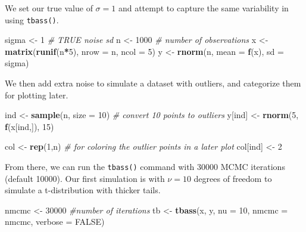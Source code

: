 \documentclass[
]{article}
\newenvironment{Shaded}{\begin{snugshade}}{\end{snugshade}}
\newcommand{\CommentTok}[1]{\textcolor[rgb]{0.56,0.35,0.01}{\textit{#1}}}
\newcommand{\DataTypeTok}[1]{\textcolor[rgb]{0.13,0.29,0.53}{#1}}
\newcommand{\DecValTok}[1]{\textcolor[rgb]{0.00,0.00,0.81}{#1}}
\newcommand{\KeywordTok}[1]{\textcolor[rgb]{0.13,0.29,0.53}{\textbf{#1}}}
\newcommand{\NormalTok}[1]{#1}
\newcommand{\OperatorTok}[1]{\textcolor[rgb]{0.81,0.36,0.00}{\textbf{#1}}}
\newcommand{\OtherTok}[1]{\textcolor[rgb]{0.56,0.35,0.01}{#1}}
\newcommand{\StringTok}[1]{\textcolor[rgb]{0.31,0.60,0.02}{#1}}
\begin{document}
We set our true value of \(\sigma = 1\) and attempt to capture the same
variability in using \texttt{tbass()}.

\begin{Shaded}
\begin{Highlighting}[]
\NormalTok{sigma <-}\StringTok{ }\DecValTok{1} \CommentTok{# TRUE noise sd}
\NormalTok{n <-}\StringTok{ }\DecValTok{1000} \CommentTok{# number of observations}
\NormalTok{x <-}\StringTok{ }\KeywordTok{matrix}\NormalTok{(}\KeywordTok{runif}\NormalTok{(n}\OperatorTok{*}\DecValTok{5}\NormalTok{), }\DataTypeTok{nrow =}\NormalTok{ n, }\DataTypeTok{ncol =} \DecValTok{5}\NormalTok{)}
\NormalTok{y <-}\StringTok{ }\KeywordTok{rnorm}\NormalTok{(n, }\DataTypeTok{mean =} \KeywordTok{f}\NormalTok{(x), }\DataTypeTok{sd =}\NormalTok{ sigma)}
\end{Highlighting}
\end{Shaded}

We then add extra noise to simulate a dataset with outliers, and
categorize them for plotting later.

\begin{Shaded}
\begin{Highlighting}[]
\NormalTok{ind <-}\StringTok{ }\KeywordTok{sample}\NormalTok{(n, }\DataTypeTok{size =} \DecValTok{10}\NormalTok{) }\CommentTok{# convert 10 points to outliers}
\NormalTok{y[ind] <-}\StringTok{ }\KeywordTok{rnorm}\NormalTok{(}\DecValTok{5}\NormalTok{, }\KeywordTok{f}\NormalTok{(x[ind,]), }\DecValTok{15}\NormalTok{)}

\NormalTok{col <-}\StringTok{ }\KeywordTok{rep}\NormalTok{(}\DecValTok{1}\NormalTok{,n) }\CommentTok{# for coloring the outlier points in a later plot}
\NormalTok{col[ind] <-}\StringTok{ }\DecValTok{2}
\end{Highlighting}
\end{Shaded}

From there, we can run the \texttt{tbass()} command with 30000 MCMC
iterations (default 10000). Our first simulation is with \(\nu = 10\)
degrees of freedom to simulate a t-distribution with thicker tails.

\begin{Shaded}
\begin{Highlighting}[]
\NormalTok{nmcmc <-}\StringTok{ }\DecValTok{30000} \CommentTok{#number of iterations}
\NormalTok{tb <-}\StringTok{ }\KeywordTok{tbass}\NormalTok{(x, y, }\DataTypeTok{nu =} \DecValTok{10}\NormalTok{, }\DataTypeTok{nmcmc =}\NormalTok{ nmcmc, }\DataTypeTok{verbose =} \OtherTok{FALSE}\NormalTok{)}
\end{Highlighting}
\end{Shaded}
\end{document}
